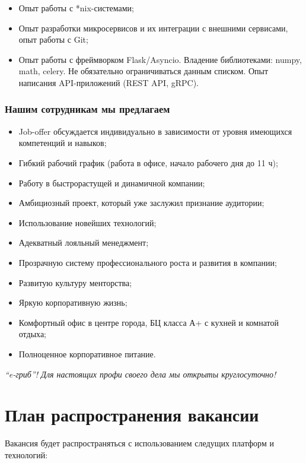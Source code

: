 \documentclass[a4paper,8pt]{article}
\begin{document}
    \begin{itemize}
        \item Опыт работы с *nix-системами;
        \item Опыт разработки микросервисов и их интеграции с внешними сервисами, опыт работы с Git;
        \item Опыт работы с фреймворком Flask/Asyncio. Владение библиотеками: numpy, math, celery. Не обязательно ограничиваться данным списком. Опыт написания API-приложений (REST API, gRPC).
    \end{itemize}


\subsubsection*{Нашим сотрудникам мы предлагаем}


    \begin{itemize}
        \item Job-offer обсуждается индивидуально в зависимости от уровня имеющихся компетенций и навыков;
        \item Гибкий рабочий график (работа в офисе, начало рабочего дня до 11 ч);
        \item Работу в быстрорастущей и динамичной компании;
        \item Амбициозный проект, который уже заслужил признание аудитории;
        \item Использование новейших технологий;
        \item Адекватный лояльный менеджмент;
        \item Прозрачную систему профессионального роста и развития в компании;
        \item Развитую культуру менторства;
        \item Яркую корпоративную жизнь;
        \item Комфортный офис в центре города, БЦ класса А+ с кухней и комнатой отдыха;
        \item Полноценное корпоративное питание.
    \end{itemize}

\textit{``e-гриб''! Для настоящих профи своего дела мы открыты круглосуточно!}


\newpage
\section*{План распространения вакансии}

Вакансия будет распространяться с использованием следущих платформ и технологий:
\end{document}
